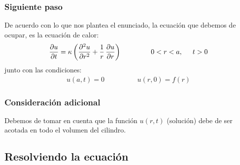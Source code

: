 \documentclass[12pt]{beamer}
\begin{document}
\begin{frame}
\frametitle{Siguiente paso}
De acuerdo con lo que nos plantea el enunciado, la ecuación que debemos de ocupar, es la ecuación de calor:
\begin{align}
\pdv{u}{t} = \kappa \left( \pdv[2]{u}{r} + \dfrac{1}{r}  \, \pdv{u}{r} \right) \hspace{1.5cm} 0 < r < a, \hspace{0.5cm} t > 0
\label{eq:ecuacion_CilBessel_01}
\end{align}
\pause
junto con las condiciones:
\begin{align}
u(a, t) = 0 \hspace{2cm} u(r, 0) = f(r)
\label{eq:ecuacion_CilBessel_02}
\end{align}
\end{frame}
\begin{frame}
\frametitle{Consideración adicional}
Debemos de tomar en cuenta que la función $u(r, t)$ (solución) debe de ser acotada en todo el volumen del cilindro.
\end{frame}

\subsection{Resolviendo la ecuación}
\end{document}
